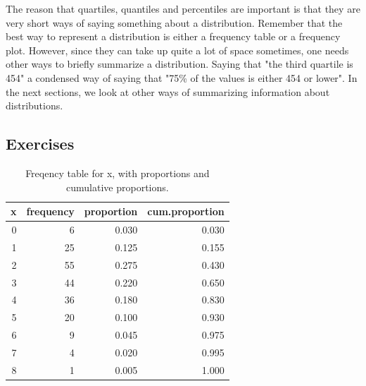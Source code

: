 \documentclass[]{report}\usepackage[]{graphicx}\usepackage[]{color}
\begin{document}
The reason that quartiles, quantiles and percentiles are important is that they are very short ways of saying something about a distribution. Remember that the best way to represent a distribution is either a frequency table or a frequency plot. However, since they can take up quite a lot of space sometimes, one needs other ways to briefly summarize a distribution. Saying that "the third quartile is 454" a condensed way of saying that "75\% of the values is either 454 or lower". In the next sections, we look at other ways of summarizing information about distributions.

\subsection{Exercises}

\begin{table}[ht]
\centering
\caption{Freqency table for x, with proportions and cumulative proportions.} 
\label{tab:frequency_2}
\begin{tabular}{rrrr}
  \hline
x & frequency & proportion & cum.proportion \\ 
  \hline
   0 &    6 & 0.030 & 0.030 \\ 
     1 &   25 & 0.125 & 0.155 \\ 
     2 &   55 & 0.275 & 0.430 \\ 
     3 &   44 & 0.220 & 0.650 \\ 
     4 &   36 & 0.180 & 0.830 \\ 
     5 &   20 & 0.100 & 0.930 \\ 
     6 &    9 & 0.045 & 0.975 \\ 
     7 &    4 & 0.020 & 0.995 \\ 
     8 &    1 & 0.005 & 1.000 \\ 
   \hline
\end{tabular}
\end{table}
\end{document}
